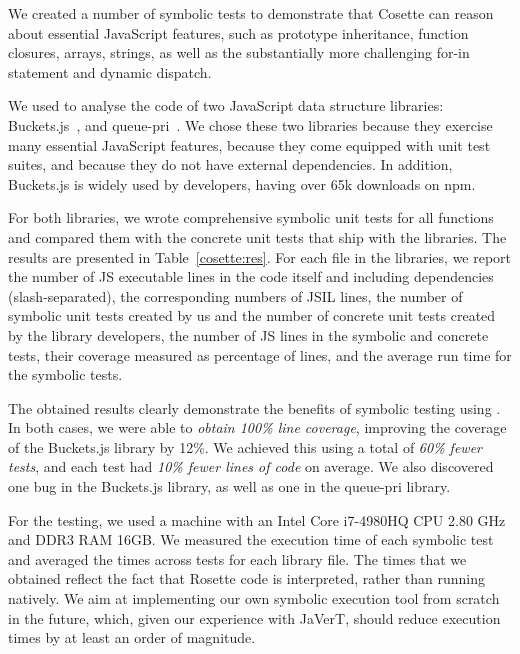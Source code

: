 We created a number of symbolic tests to demonstrate that Cosette can reason about essential JavaScript features, such as prototype inheritance, function closures, arrays, strings, as well as the substantially more challenging for-in statement and dynamic dispatch. 

We used \cosette to analyse the code of two JavaScript data structure libraries: Buckets.js~\cite{buckets}, and queue-pri~\cite{priq}.
We chose these two libraries because they exercise many essential JavaScript features, because they come equipped with unit test suites, and because they do not have external dependencies. In addition, Buckets.js is widely used by developers, having over 65k downloads on npm.

For both libraries, we wrote comprehensive symbolic unit tests for all functions and compared them with the concrete unit tests that ship with the libraries. The results are presented in Table~\ref{cosette:res}.
For each file in the libraries, we report the number of JS executable lines in the code itself and including dependencies (slash-separated), the corresponding numbers of JSIL lines, the number of symbolic unit tests created by us and the number of concrete unit tests created by the library developers, the number of JS lines in the symbolic and concrete tests, their coverage measured as percentage of lines, and the average \cosette run time for the symbolic tests.

The obtained results clearly demonstrate the benefits of symbolic testing using \cosette.
In both cases, we were able to \emph{obtain 100\% line coverage}, improving the coverage of the Buckets.js library by 12\%.
We achieved this using a total of \emph{60\% fewer tests}, and each test had \emph{10\% fewer lines of code} on average.
We also discovered one bug in the Buckets.js library, as well as one in the queue-pri library. 


For the testing, we used a machine with an Intel Core i7-4980HQ CPU 2.80 GHz and DDR3 RAM 16GB. We measured the execution time of each symbolic test and averaged the times across tests for each library file. The times that we obtained reflect the fact that Rosette code is interpreted, rather than running natively. We aim at implementing our own symbolic execution tool from scratch in the future, which, given our experience with JaVerT, should reduce execution times by at least an order of magnitude.

